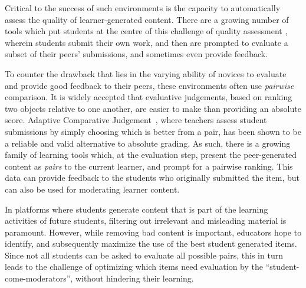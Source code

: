 \documentclass[runningheads]{llncs}
\begin{document}
Critical to the success of such environments is the capacity to 
automatically assess the quality of learner-generated content.
There are a growing number of tools which put students at the centre of this 
challenge of quality assessment
\cite{potter_compair:_2017}\cite{cambre_juxtapeer:_2018},
wherein students submit their own work, and then are prompted to 
evaluate a subset of their peers' submissions, and sometimes even provide 
feedback.

To counter the drawback that lies in the varying ability of novices to evaluate 
and provide good feedback to their peers, these environments often use 
\textit{pairwise} comparison. 
It is widely accepted that evaluative judgements, based on ranking two objects 
relative to one another, are easier to make than providing an absolute score. 
Adaptive Comparative Judgement~\cite{pollitt_method_2012}, where teachers 
assess student submissions by simply choosing which is better from a pair, has 
been shown to be a reliable and valid alternative to absolute grading.
As such, there is a growing family of learning tools which, at the evaluation 
step, present the peer-generated content as \textit{pairs} to the current 
learner, and prompt for a pairwise ranking. 
This data can provide feedback to the students who originally submitted the 
item, but can also be used for moderating learner content.

In platforms where students generate content that is part of the learning 
activities of future students, filtering out irrelevant and misleading material 
is paramount. 
However, while removing bad content is important, educators hope to identify, 
and subsequently maximize the use of the best student generated items.
Since not all students can be asked to evaluate all possible pairs, this in 
turn leads to the challenge of optimizing which items need evaluation by the 
``student-come-moderators'', without hindering their learning.
 
\end{document}
